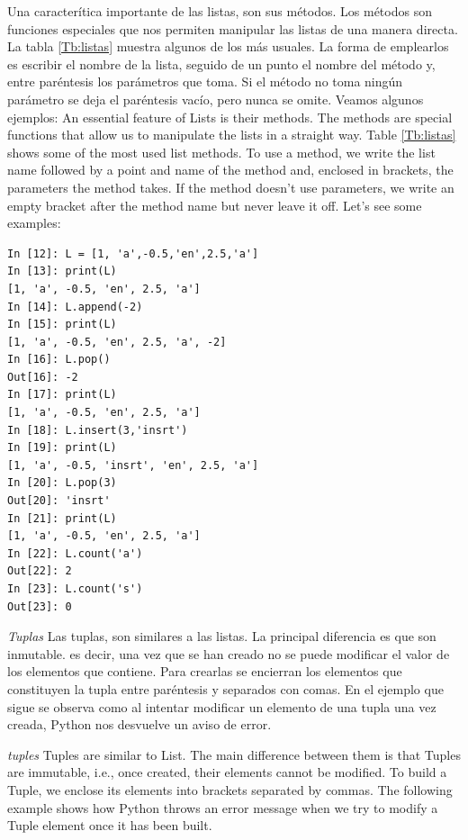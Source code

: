\begin{paracol}{2}
Una caracterítica importante de las listas, son sus métodos. Los métodos son funciones especiales que nos permiten manipular las listas de una manera directa. La tabla \ref{Tb:listas} muestra algunos de los más usuales. La forma de emplearlos es escribir el nombre de la lista, seguido de un punto el nombre del método y, entre paréntesis los parámetros que toma. Si el método no toma ningún parámetro se deja el paréntesis vacío, pero nunca se omite. Veamos algunos ejemplos:
\switchcolumn
An essential feature of Lists is their methods. The methods are special functions that allow us to manipulate the lists in a straight way. Table \ref{Tb:listas} shows some of the most used list methods. To use a method, we write the list name followed by a point and name of the method and, enclosed in brackets, the parameters the method takes. If the method doesn't use parameters, we write an empty bracket after the method name but never leave it off. Let's see some examples:
\end{paracol}

\begin{center}
    \begin{minipage}{0.5\textwidth}
\begin{verbatim}
In [12]: L = [1, 'a',-0.5,'en',2.5,'a']
In [13]: print(L)
[1, 'a', -0.5, 'en', 2.5, 'a']
In [14]: L.append(-2)
In [15]: print(L)
[1, 'a', -0.5, 'en', 2.5, 'a', -2]
In [16]: L.pop()
Out[16]: -2
In [17]: print(L)
[1, 'a', -0.5, 'en', 2.5, 'a']
In [18]: L.insert(3,'insrt')
In [19]: print(L)
[1, 'a', -0.5, 'insrt', 'en', 2.5, 'a']
In [20]: L.pop(3)
Out[20]: 'insrt'
In [21]: print(L)
[1, 'a', -0.5, 'en', 2.5, 'a']
In [22]: L.count('a')
Out[22]: 2
In [23]: L.count('s')
Out[23]: 0
\end{verbatim}
    \end{minipage}
\end{center}

\begin{paracol}{2}

\emph{Tuplas} Las tuplas, son similares a las listas. La principal diferencia es que son inmutable. es decir, una vez que se han creado no se puede modificar el valor de los elementos que contiene. Para crearlas se encierran los elementos que constituyen la tupla entre paréntesis y separados con comas. En el ejemplo que sigue se observa como al intentar modificar un elemento de una tupla una vez creada, Python nos desvuelve un aviso de error.
\switchcolumn

\emph{tuples} Tuples are similar to List. The main difference between them is that Tuples are immutable, i.e., once created, their elements cannot be modified. To build a Tuple, we enclose its elements into brackets separated by commas. The following example shows how Python throws an error message when we try to modify a Tuple element once it has been built.
\end{paracol}

